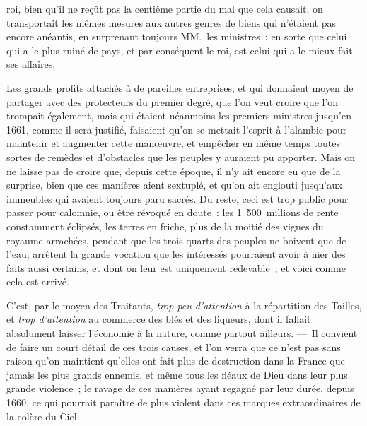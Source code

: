 \documentclass[french,twoside]{book} %
\begin{document}
roi, bien qu’il ne reçût pas la centième partie du mal que cela causait, on transportait les mêmes mesures aux autres genres de biens qui n’étaient pas encore anéantis, en surprenant toujours MM. les ministres ; en sorte que celui qui a le plus ruiné de pays, et par conséquent le roi, est celui qui a le mieux fait ses affaires.\par
Les grands profits attachés à de pareilles entreprises, et qui donnaient moyen de partager avec des protecteurs du premier degré, que l’on veut croire que l’on trompait également, mais qui étaient néanmoins les premiers ministres jusqu’en 1661, comme il sera justifié, faisaient qu’on se mettait l’esprit à l’alambic pour maintenir et augmenter cette manœuvre, et empêcher en même temps toutes sortes de remèdes et d’obstacles que les peuples y auraient pu apporter. Mais on ne laisse pas de croire que, depuis cette époque, il n’y ait encore eu que de la surprise, bien que ces manières aient sextuplé, et qu’on ait englouti jusqu’aux immeubles qui avaient toujours paru sacrés. Du reste, ceci est trop public pour passer pour calomnie, ou être révoqué en doute : les 1 500 millions de rente constamment éclipsés, les terres en friche, plus de la moitié des vignes du royaume arrachées, pendant que les trois quarts des peuples ne boivent que de l’eau, arrêtent la grande vocation que les intéressés pourraient avoir à nier des faits aussi certains, et dont on leur est uniquement redevable ; et voici comme cela est arrivé.\par
C’est, par le moyen des Traitants, {\itshape trop peu d’attention} à la répartition des Tailles, et {\itshape trop d’attention} au commerce des blés et des liqueurs, dont il fallait absolument laisser l’économie à la nature, comme partout ailleurs. — Il convient de faire un court détail de ces trois causes, et l’on verra que ce n’est pas sans raison qu’on maintient qu’elles ont fait plus de destruction dans la France que jamais les plus grands ennemis, et même tous les fléaux de Dieu dans leur plus grande violence ; le ravage de ces manières ayant regagné par leur durée, depuis 1660, ce qui pourrait paraître de plus violent dans ces marques extraordinaires de la colère du Ciel.
\end{document}
